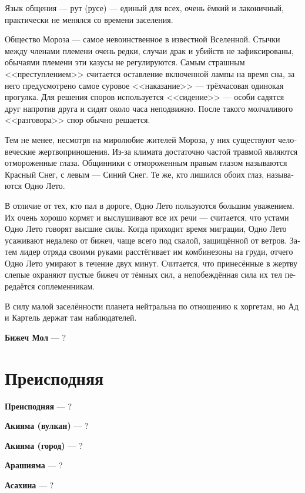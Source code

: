 \documentclass[a4paper,12pt,fleqn]{book}\usepackage{cooltooltips}\usepackage{polyglossia}\setdefaultlanguage[babelshorthands=true]{russian}\setotherlanguage{english}\defaultfontfeatures{Ligatures=TeX,Mapping=tex-text} \usepackage{xcolor}\definecolor{lightgray}{HTML}{bbbbbb}\color{lightgray}\newcommand{\ml}[3]{\textenglish{\textcolor{black}{#3}}}
\newcommand{\asterism}{\vspace{1em}{\centering\Large\bfseries$\ast~\ast~\ast$\par}\vspace{1em}}
\newcommand{\theterm}[3]{\textbf{\hypertarget{#1}{#2}} --- #3}
\begin{document}
{Язык общения --- рут (русе) --- единый для всех, очень ёмкий и лаконичный, практически не менялся со времени заселения.

Общество Мороза --- самое невоинственное в известной Вселенной.
Стычки между членами племени очень редки, случаи драк и убийств не зафиксированы, обычаями племени эти казусы не регулируются.
Самым страшным <<преступлением>> считается оставление включенной лампы на время сна, за него предусмотрено самое суровое <<наказание>> --- трёхчасовая одинокая прогулка.
Для решения споров используется <<сидение>> --- особи садятся друг напротив друга и сидят около часа неподвижно.
После такого молчаливого <<разговора>> спор обычно решается.

Тем не менее, несмотря на миролюбие жителей Мороза, у них существуют человеческие жертвоприношения.
Из-за климата достаточно частой травмой являются отмороженные глаза.
Общинники с отмороженным правым глазом называются Красный Снег, с левым --- Синий Снег.
Те же, кто лишился обоих глаз, называются Одно Лето.

В отличие от тех, кто пал в дороге, Одно Лето пользуются большим уважением.
Их очень хорошо кормят и выслушивают все их речи --- считается, что устами Одно Лето говорят высшие силы.
Когда приходит время миграции, Одно Лето усаживают недалеко от бижеч, чаще всего под скалой, защищённой от ветров.
Затем лидер отряда своими руками расстёгивает им комбинезоны на груди, отчего Одно Лето умирают в течение двух минут.
Считается, что принесённые в жертву слепые охраняют пустые бижеч от тёмных сил, а непобеждённая сила их тел передаётся соплеменникам.

В силу малой заселённости планета нейтральна по отношению к хоргетам, но Ад и Картель держат там наблюдателей.}

\asterism

\theterm{bizec-mol}
{Бижеч Мол}
{?}

\section{Преисподняя}

\theterm{netherworld}
{Преисподняя}
{?}

\asterism

\theterm{akiyama-volcano}
{Акияма (вулкан)}
{?}

\theterm{akiyama-town}
{Акияма (город)}
{?}

\theterm{arashiyama}
{Арашияма}
{?}

\theterm{asahina}
{Асахина}
{?}
\end{document}
